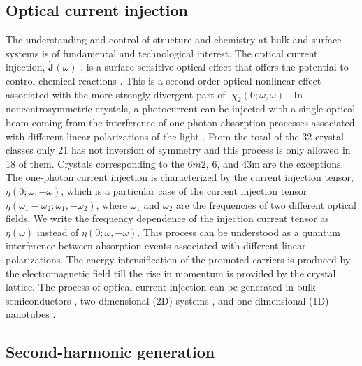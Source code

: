 \documentclass[pss]{wiley2sp} %
\begin{document}
\subsection{Optical current injection}

The understanding and control of structure and chemistry at bulk and surface systems is of fundamental and technological interest. The optical current injection, $\mathbf{\dot{J}}(\omega)$ , is a surface-sensitive optical effect that offers the potential to control chemical reactions \cite{bhatPRB05,hachePRL97}. This is a second-order optical nonlinear effect associated with the more strongly divergent part of 􏰡$\chi_{2}(0;\omega,\omega)$ \cite{sipePRB00}. In noncentrosymmetric crystals, a photocurrent can be injected with a single optical beam coming  from the interference of one-photon absorption processes associated with different linear polarizations of the light \cite{sipePRB00}. From the total of the 32 crystal classes only 21 has not inversion of symmetry and this process is only allowed in 18 of them. Crystals corresponding to the $\bar{6}m\bar{2}$, $\bar{6}$, and $\bar{4}$$\bar{3}$m are the exceptions. The one-photon current injection is characterized by the current injection tensor, $\eta(0; \omega, − \omega)$, which is a particular case of the current injection tensor $\eta(\omega_{1}-\omega_{2}; \omega_{1},-\omega_{2})$, where $\omega_{1}$ and $\omega_{2}$ are the frequencies of two different optical fields. We write the frequency dependence of the injection current tensor as $\eta(\omega)$ instead of $\eta(0; \omega, − \omega)$. This process can be understood as a quantum interference between absorption events associated with different linear polarizations. The energy intensification of the promoted carriers is produced by the electromagnetic field till the rise in momentum is provided by the crystal lattice. The process of optical current injection can be generated in bulk semiconductors \cite{hachePRL97,sipePRB00}, two-dimensional (2D) systems \cite{melePRB00,cabellosPRB11}, and one-dimensional (1D) nanotubes \cite{melePRB00}. 

\subsection{Second-harmonic generation}
\end{document}
